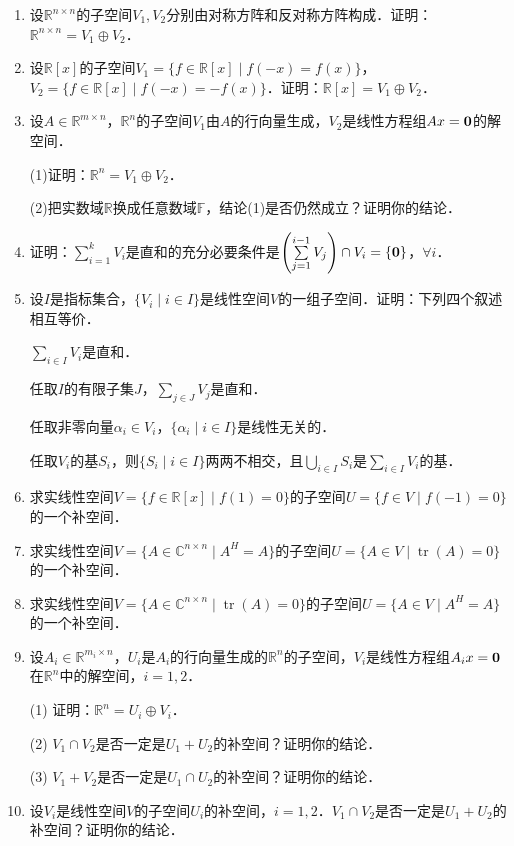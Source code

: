 \documentclass[a4paper,fontset=windows]{ctexbook}
\theoremstyle{definition}
\DeclareMathOperator{\tr}{tr}
\begin{document}
\begin{enumerate}
\item 设$\mathbb{R}^{n\times n}$的子空间$V_1,V_2$分别由对称方阵和反对称方阵构成．证明：$\mathbb{R}^{n\times n}=V_1\oplus V_2$．

\item 设$\mathbb{R}[x]$的子空间$V_1=\{f\in\mathbb{R}[x]\mid f(-x)=f(x)\}$，$V_2=\{f\in\mathbb{R}[x]\mid f(-x)=-f(x)\}$．证明：$\mathbb{R}[x]=V_1\oplus V_2$．

\item 设$A\in\mathbb{R}^{m\times n}$，$\mathbb{R}^n$的子空间$V_1$由$A$的行向量生成，$V_2$是线性方程组$Ax={\bf 0}$的解空间．

(1)证明：$\mathbb{R}^n=V_1\oplus V_2$．

(2)把实数域$\mathbb{R}$换成任意数域$\mathbb{F}$，结论(1)是否仍然成立？证明你的结论．

\item 证明：$\sum\limits_{i=1}^kV_i$是直和的充分必要条件是$\left(\sum\limits_{j=1}^{i-1}V_j\right)\cap V_i=\{{\bf 0}\}$，$\forall i$．

\item 设$I$是指标集合，$\{V_i\mid i\in I\}$是线性空间$V$的一组子空间．证明：下列四个叙述相互等价．

 $\sum\limits_{i\in I}V_i$是直和．

 任取$I$的有限子集$J$，$\sum\limits_{j\in J}V_j$是直和．

 任取非零向量$\alpha_i\in V_i$，$\{\alpha_i\mid i\in I\}$是线性无关的．

 任取$V_i$的基$S_i$，则$\{S_i\mid i\in I\}$两两不相交，且$\bigcup\limits_{i\in I}S_i$是$\sum\limits_{i\in I}V_i$的基．

\item 求实线性空间$V=\{f\in\mathbb{R}[x]\mid f(1) =0\}$的子空间$U=\{f\in V\mid f(-1)=0\}$的一个补空间．

\item 求实线性空间$V=\{A\in\mathbb{C}^{n\times n}\mid A^H=A\}$的子空间$U=\{A\in V\mid\tr(A)=0\}$的一个补空间．

\item 求实线性空间$V=\{A\in\mathbb{C}^{n\times n}\mid\tr(A)=0\}$的子空间$U=\{A\in V\mid A^H=A\}$的一个补空间．

\item 设$A_i\in\mathbb{R}^{m_i\times n}$，$U_i$是$A_i$的行向量生成的$\mathbb{R}^n$的子空间，$V_i$是线性方程组$A_ix={\bf 0}$在$\mathbb{R}^n$中的解空间，$i=1,2$．

(1) 证明：$\mathbb{R}^n=U_i\oplus V_i$．

(2) $V_1\cap V_2$是否一定是$U_1+U_2$的补空间？证明你的结论．

(3) $V_1+V_2$是否一定是$U_1\cap U_2$的补空间？证明你的结论．

\item 设$V_i$是线性空间$V$的子空间$U_i$的补空间，$i=1,2$．$V_1\cap V_2$是否一定是$U_1+U_2$的补空间？证明你的结论．

\end{enumerate}
\end{document}
